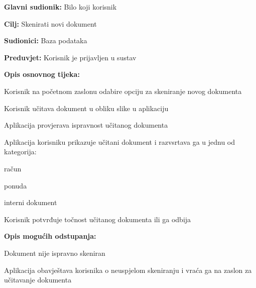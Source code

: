 					\noindent {}
					\begin{packed_item}
	
						\item \textbf{Glavni sudionik:} Bilo koji korisnik
						\item  \textbf{Cilj:} Skenirati novi dokument
						\item  \textbf{Sudionici:} Baza podataka
						\item  \textbf{Preduvjet:} Korisnik je prijavljen u sustav
						\item  \textbf{Opis osnovnog tijeka:}
						
						\item[] \begin{packed_enum}
	
							\item Korisnik na početnom zaslonu odabire opciju za skeniranje novog dokumenta
							\item Korisnik učitava dokument u obliku slike u aplikaciju
							\item Aplikacija provjerava ispravnost učitanog dokumenta
							\item Aplikacija korisniku prikazuje učitani dokument i razvsrtava ga u jednu od kategorija:

								\begin{packed_enum}
									
									\item račun
									\item ponuda
									\item interni dokument

								\end{packed_enum}

							\item Korisnik potvrđuje točnost učitanog dokumenta ili ga odbija

						\end{packed_enum}

						\item  \textbf{Opis mogućih odstupanja:}
						
						\item[] \begin{packed_item}
	
							\item[3.a] Dokument nije ispravno skeniran
							\item[] \begin{packed_enum}
								
								\item Aplikacija obavještava korisnika o neuspjelom skeniranju i vraća ga na zaslon za učitavanje dokumenta
								
							\end{packed_enum}
							
						\end{packed_item}

					\end{packed_item}


